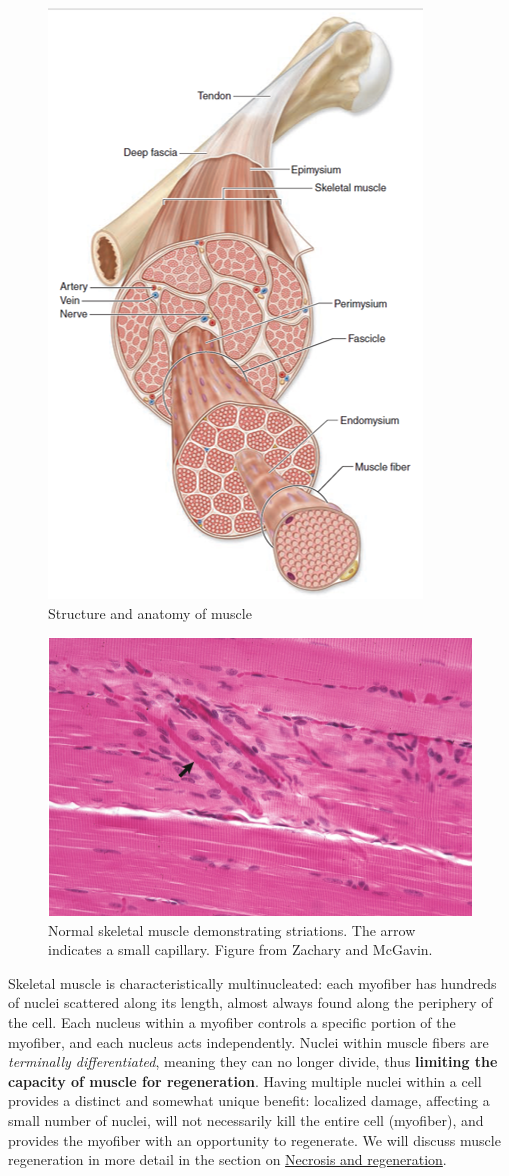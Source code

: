 \documentclass[openany]{report}
\begin{document}
\begin{figure}

{\centering \includegraphics[width=0.4\linewidth]{images/muscle_structure} 

}

\caption{Structure and anatomy of muscle}\label{fig:muscle-structure}
\end{figure}

\begin{figure}

{\centering \includegraphics[width=0.5\linewidth]{images/muscle_histo} 

}

\caption{Normal skeletal muscle demonstrating striations. The arrow indicates a small capillary. Figure from Zachary and McGavin.}\label{fig:muscle-histo}
\end{figure}

Skeletal muscle is characteristically multinucleated: each myofiber has
hundreds of nuclei scattered along its length, almost always found along
the periphery of the cell. Each nucleus within a myofiber controls a
specific portion of the myofiber, and each nucleus acts independently.
Nuclei within muscle fibers are \emph{terminally differentiated},
meaning they can no longer divide, thus \textbf{limiting the capacity of
muscle for regeneration}. Having multiple nuclei within a cell provides
a distinct and somewhat unique benefit: localized damage, affecting a
small number of nuclei, will not necessarily kill the entire cell
(myofiber), and provides the myofiber with an opportunity to regenerate.
We will discuss muscle regeneration in more detail in the section on
\protect\hyperlink{necrosis-and-regeneration}{Necrosis and
regeneration}.
\end{document}
